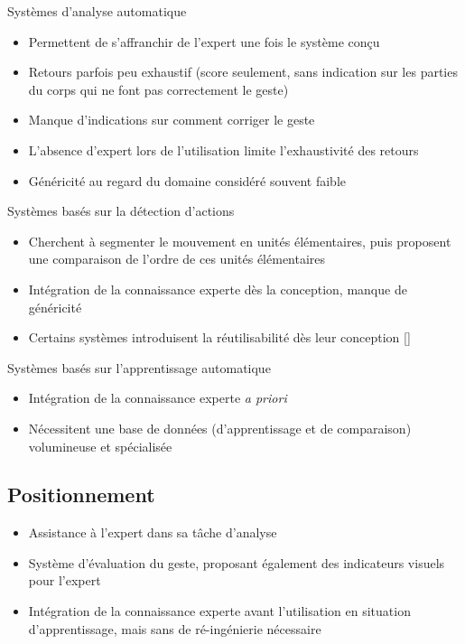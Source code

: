 \documentclass[svgnames]{beamer}
\newcommand{\mycite}[1]{[\textit{\cite{#1}}]}
\begin{document}
	\begin{frame}{\subsecname}
		\begin{block}{Systèmes d'analyse automatique}
			\begin{itemize}[label=$\bullet$]
				\item Permettent de s'affranchir de l'expert une fois le système conçu
				\item Retours parfois peu exhaustif (score seulement, sans indication sur les parties du corps qui ne font pas correctement le geste)
				\item Manque d'indications sur comment corriger le geste
				\item L'absence d'expert lors de l'utilisation limite l'exhaustivité des retours
				\item Généricité au regard du domaine considéré souvent faible
			\end{itemize}
		\end{block}
		
		\begin{block}{Systèmes basés sur la détection d'actions}
			\begin{itemize}[label=$\bullet$]
				\item Cherchent à segmenter le mouvement en unités élémentaires, puis proposent une comparaison de l'ordre de ces unités élémentaires
				\item Intégration de la connaissance experte dès la conception, manque de généricité
				\item Certains systèmes introduisent la réutilisabilité dès leur conception \mycite{Mahdi2019TaE, Delest2019MaE}
			\end{itemize}
		\end{block}
		
		\begin{block}{Systèmes basés sur l'apprentissage automatique}
			\begin{itemize}[label=$\bullet$]
				\item Intégration de la connaissance experte \textit{a priori}
				\item Nécessitent une base de données (d'apprentissage et de comparaison) volumineuse et spécialisée
			\end{itemize}
		\end{block}
	\end{frame}
	
	\subsection{Positionnement}
	\begin{frame}{\subsecname}
		\begin{itemize}[label=$\bullet$]
			\item Assistance à l'expert dans sa tâche d'analyse
			\item Système d'évaluation du geste, proposant également des indicateurs visuels pour l'expert
			\item Intégration de la connaissance experte avant l'utilisation en situation d'apprentissage, mais sans de ré-ingénierie nécessaire 
		\end{itemize}
	\end{frame}
\end{document}
